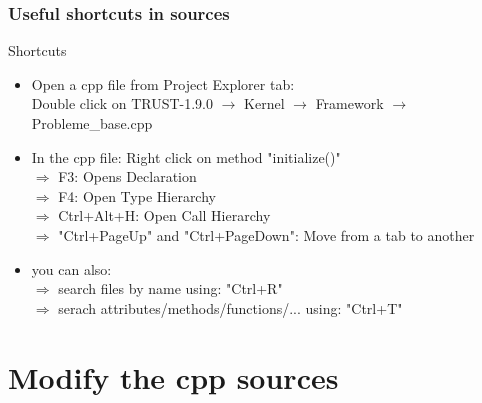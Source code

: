 \documentclass[10pt, hyperref={unicode=true,pdfusetitle, bookmarks=true,bookmarksnumbered=false,bookmarksopen=false, breaklinks=false,pdfborder={0 0 1},backref=true,colorlinks=true,linkcolor=darkblue,pageanchor, urlcolor=darkblue}]{beamer}
\begin{document}
\begin{frame}
\frametitle{Useful shortcuts in sources}

\begin{exampleblock}{Shortcuts}
\vspace{0.2cm}
\begin{itemize} 
\item Open a cpp file from Project Explorer tab: \\
  Double click on TRUST-1.9.0 $\rightarrow$ Kernel $\rightarrow$ Framework $\rightarrow$ Probleme\_base.cpp \\ \vspace{0.2cm}
\item In the cpp file: Right click on method "initialize()" \\
  $\Rightarrow$ F3: Opens Declaration \\
  $\Rightarrow$ F4: Open Type Hierarchy \\
  $\Rightarrow$ Ctrl+Alt+H: Open Call Hierarchy \\
  $\Rightarrow$ "Ctrl+PageUp" and "Ctrl+PageDown": Move from a tab to another
\item you can also: \\
  $\Rightarrow$ search files by name using: "Ctrl+R" \\
  $\Rightarrow$ serach attributes/methods/functions/... using: "Ctrl+T"
\end{itemize}
\end{exampleblock}

\end{frame}


\section{{\bf{Modify the cpp sources}}}
\end{document}
